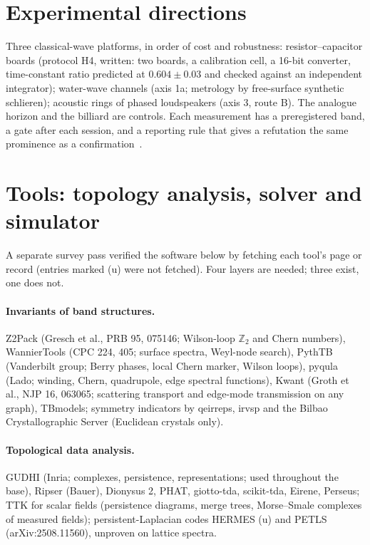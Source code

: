 \documentclass[11pt,a4paper]{article}
\begin{document}
\section{Experimental directions}\label{sec:expdir}
Three classical-wave platforms, in order of cost and robustness: resistor--capacitor boards (protocol H4, written: two boards, a calibration cell, a 16-bit converter, time-constant ratio predicted at $0.604\pm0.03$ and checked against an independent integrator); water-wave channels (axis 1a; metrology by free-surface synthetic schlieren); acoustic rings of phased loudspeakers (axis 3, route B). The analogue horizon and the billiard are controls. Each measurement has a preregistered band, a gate after each session, and a reporting rule that gives a refutation the same prominence as a confirmation~\cite{Protocol}.

\section{Tools: topology analysis, solver and simulator}\label{sec:tools}
A separate survey pass verified the software below by fetching each tool's page or record (entries marked (u) were not fetched). Four layers are needed; three exist, one does not.

\paragraph{Invariants of band structures.} Z2Pack (Gresch et al., PRB 95, 075146; Wilson-loop $\mathbb Z_2$ and Chern numbers), WannierTools (CPC 224, 405; surface spectra, Weyl-node search), PythTB (Vanderbilt group; Berry phases, local Chern marker, Wilson loops), pyqula (Lado; winding, Chern, quadrupole, edge spectral functions), Kwant (Groth et al., NJP 16, 063065; scattering transport and edge-mode transmission on any graph), TBmodels; symmetry indicators by qeirreps, irvsp and the Bilbao Crystallographic Server (Euclidean crystals only).
\paragraph{Topological data analysis.} GUDHI (Inria; complexes, persistence, representations; used throughout the base), Ripser (Bauer), Dionysus 2, PHAT, giotto-tda, scikit-tda, Eirene, Perseus; TTK for scalar fields (persistence diagrams, merge trees, Morse--Smale complexes of measured fields); persistent-Laplacian codes HERMES (u) and PETLS (arXiv:2508.11560), unproven on lattice spectra.
\end{document}

